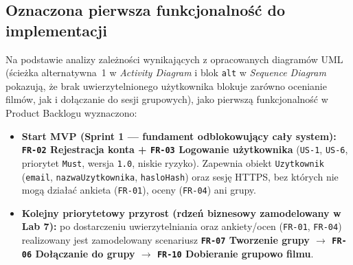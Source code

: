 \documentclass[10pt,a4paper]{article}
\begin{document}
\subsection*{Oznaczona pierwsza funkcjonalność do implementacji}
Na podstawie analizy zależności wynikających z opracowanych diagramów UML (ścieżka alternatywna~1 w \textit{Activity Diagram} i blok \texttt{alt} w \textit{Sequence Diagram} pokazują, że brak uwierzytelnionego użytkownika blokuje zarówno ocenianie filmów, jak i dołączanie do sesji grupowych), jako pierwszą funkcjonalność w Product Backlogu wyznaczono:
\begin{itemize}
  \item \textbf{Start MVP (Sprint 1 — fundament odblokowujący cały system):} \textbf{\texttt{FR-02} Rejestracja konta + \texttt{FR-03} Logowanie użytkownika} (\texttt{US-1}, \texttt{US-6}, priorytet \texttt{Must}, wersja \texttt{1.0}, niskie ryzyko). Zapewnia obiekt \texttt{Uzytkownik} (\texttt{email}, \texttt{nazwaUzytkownika}, \texttt{hasloHash}) oraz sesję HTTPS, bez których nie mogą działać ankieta (\texttt{FR-01}), oceny (\texttt{FR-04}) ani grupy.
  \item \textbf{Kolejny priorytetowy przyrost (rdzeń biznesowy zamodelowany w Lab 7):} po dostarczeniu uwierzytelniania oraz ankiety/ocen (\texttt{FR-01}, \texttt{FR-04}) realizowany jest zamodelowany scenariusz \textbf{\texttt{FR-07} Tworzenie grupy $\to$ \texttt{FR-06} Dołączanie do grupy $\to$ \texttt{FR-10} Dobieranie grupowo filmu}.
\end{itemize}
\end{document}
